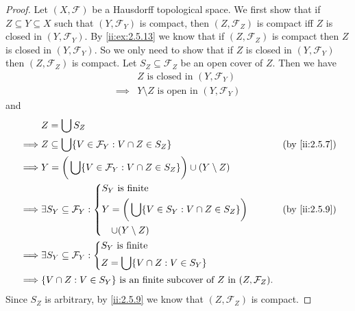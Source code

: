 \begin{proof}
  Let \((X, \mathcal{F})\) be a Hausdorff topological space.
  We first show that if \(Z \subseteq Y \subseteq X\) such that \((Y, \mathcal{F}_Y)\) is compact, then \((Z, \mathcal{F}_Z)\) is compact iff \(Z\) is closed in \((Y, \mathcal{F}_Y)\).
  By \cref{ii:ex:2.5.13} we know that if \((Z, \mathcal{F}_Z)\) is compact then \(Z\) is closed in \((Y, \mathcal{F}_Y)\).
  So we only need to show that if \(Z\) is closed in \((Y, \mathcal{F}_Y)\) then \((Z, \mathcal{F}_Z)\) is compact.
  Let \(S_Z \subseteq \mathcal{F}_Z\) be an open cover of \(Z\).
  Then we have
  \begin{align*}
             & Z \text{ is closed in } (Y, \mathcal{F}_Y)           \\
    \implies & Y \setminus Z \text{ is open in } (Y, \mathcal{F}_Y)
  \end{align*}
  and
  \begin{align*}
             & Z = \bigcup S_Z                                                                                                \\
    \implies & Z \subseteq \bigcup \set{V \in \mathcal{F}_Y : V \cap Z \in S_Z}                               &  & \by{ii:2.5.7} \\
    \implies & Y = \bigg(\bigcup \set{V \in \mathcal{F}_Y : V \cap Z \in S_Z}\bigg) \cup (Y \setminus Z)                      \\
    \implies & \exists S_Y \subseteq \mathcal{F}_Y : \begin{dcases}
                                                       S_Y \text{ is finite}                                      \\
                                                       Y = \bigg(\bigcup \set{V \in S_Y : V \cap Z \in S_Z}\bigg) \\
                                                       \quad \cup (Y \setminus Z)
                                                     \end{dcases}                                  &  & \by{ii:2.5.9}            \\
    \implies & \exists S_Y \subseteq \mathcal{F}_Y : \begin{dcases}
                                                       S_Y \text{ is finite} \\
                                                       Z = \bigcup \set{V \cap Z : V \in S_Y}
                                                     \end{dcases}                                    \\
    \implies & \set{V \cap Z : V \in S_Y} \text{ is an finite subcover of } Z \text{ in } (Z, \mathcal{F}_Z).
  \end{align*}
  Since \(S_Z\) is arbitrary, by \cref{ii:2.5.9} we know that \((Z, \mathcal{F}_Z)\) is compact.


\end{proof}
